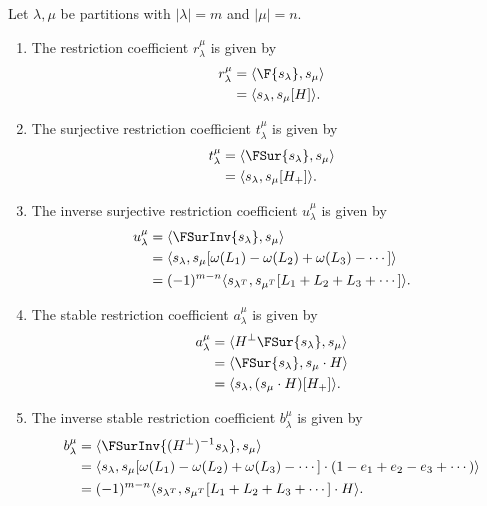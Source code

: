 \begin{theorem}\label{theorem:summary}
    Let $\lambda, \mu$ be partitions with $|\lambda| = m$ and $|\mu| = n$.
    \begin{enumerate}[label=(\alph*)]
        \item The restriction coefficient $r_\lambda^\mu$ is given by 
        \begin{align*}
            r_{\lambda}^\mu
            &= \langle \F{s_\lambda}, s_\mu\rangle \\
            &= \langle s_\lambda, s_\mu[H] \rangle.
        \end{align*}
        \item The surjective restriction coefficient $t_\lambda^\mu$ is given by 
        \begin{align*}
            t_{\lambda}^\mu &= \langle \FSur{s_\lambda}, s_\mu\rangle\\
            &= \langle s_\lambda, s_\mu[H_+] \rangle.
        \end{align*}
        \item The inverse surjective restriction coefficient $u_\lambda^\mu$ is given by
        \begin{align*}
            u_\lambda^\mu &= \langle \FSurInv{s_\lambda}, s_\mu \rangle \\
            &= \langle s_\lambda, s_\mu[\omega(L_1) - \omega(L_2) + \omega(L_3) - \cdots] \rangle \\
            &= (-1)^{m - n}\langle s_{\lambda^T}, s_{\mu^T}[L_1 + L_2 + L_3 + \cdots] \rangle.
        \end{align*}
        \item The stable restriction coefficient $a_\lambda^\mu$ is given by
        \begin{align*}
            a_\lambda^\mu &= \langle H^\perp \FSur{s_\lambda}, s_\mu\rangle \\
            &= \langle \FSur{s_\lambda}, s_\mu \cdot H\rangle \\
            &= \langle s_\lambda, (s_\mu \cdot H)[H_+]\rangle.
        \end{align*}
        \item The inverse stable restriction coefficient $b_\lambda^\mu$ is given by
        \begin{align*}
            b_\lambda^\mu &= \langle \FSurInv{(H^\perp)^{-1} s_\lambda}, s_\mu \rangle \\
            &= \langle s_\lambda, s_\mu[\omega(L_1) - \omega(L_2) + \omega(L_3) - \cdots] \cdot (1 - e_1 + e_2 - e_3 + \cdots)\rangle \\
            &= (-1)^{m - n} \langle s_{\lambda^T}, s_{\mu^T}[L_1 + L_2 + L_3 + \cdots] \cdot H \rangle.
        \end{align*}
    \end{enumerate}
\end{theorem}
